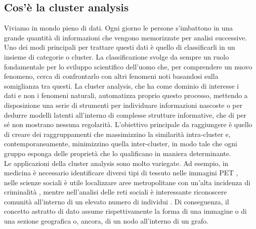 \subsection{Cos'\`e la cluster analysis} 
Viviamo in mondo pieno di dati. Ogni giorno le persone s'imbattono in una grande quantit\`a di informazioni che vengono memorizzate per analisi successive. Uno dei modi principali per trattare questi dati \`e quello di classificarli in un insieme di categorie o cluster. La classificazione svolge da sempre un ruolo fondamentale per lo sviluppo scientifico dell'uomo che, per comprendere un nuovo fenomeno, cerca di confrontarlo con altri fenomeni noti basandosi sulla somiglianza tra questi. 
La cluster analysis, che ha come dominio di interesse i dati e non i fenomeni naturali, automatizza proprio questo processo, mettendo a disposizione una serie di strumenti per individuare informazioni nascoste o per dedurre modelli latenti all'interno di complesse strutture informative, che di per s\'e non mostrano nessuna regolarit\`a. 
L'obiettivo principale da raggiungere \`e quello di creare dei raggruppamenti che massimizzino la similarit\`a intra-cluster e, contemporaneamente, minimizzino quella inter-cluster, in modo tale che ogni gruppo esponga delle propriet\`a che lo qualificano in maniera determinante.\\
Le applicazioni della cluster analysis sono molto variegate. Ad esempio, in medicina \`e necessario identificare diversi tipi di tessuto nelle immagini PET \cite{PET}, nelle scienze sociali \`e utile localizzare aree metropolitane con un'alta incidenza di criminalit\`a \cite{crime}, mentre nell'analisi delle reti sociali \`e interessante riconoscere comunit\`a all'interno di un elevato numero di individui \cite{Mishra2007}. Di conseguenza, il concetto astratto di dato assume rispettivamente la forma di una immagine o di una sezione geografica o, ancora, di un nodo all'interno di un grafo.


